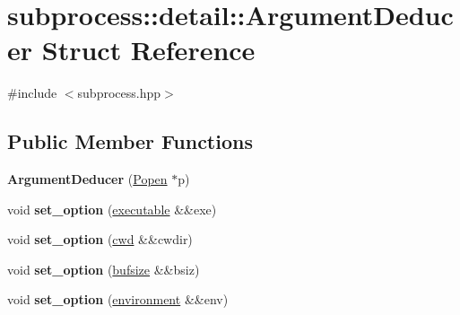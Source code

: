 \hypertarget{structsubprocess_1_1detail_1_1ArgumentDeducer}{}\section{subprocess\+:\+:detail\+:\+:Argument\+Deducer Struct Reference}
\label{structsubprocess_1_1detail_1_1ArgumentDeducer}


{\ttfamily \#include $<$subprocess.\+hpp$>$}

\subsection*{Public Member Functions}
\begin{DoxyCompactItemize}
\item 
\mbox{\label{structsubprocess_1_1detail_1_1ArgumentDeducer_abb82c9c0353424d16cc4559b6e1920f4}} 
{\bfseries Argument\+Deducer} (\hyperlink{classsubprocess_1_1Popen}{Popen} $\ast$p)
\item 
\mbox{\label{structsubprocess_1_1detail_1_1ArgumentDeducer_a91f839e8d405dfa79d1a4a78d2fa05ef}} 
void {\bfseries set\+\_\+option} (\hyperlink{structsubprocess_1_1executable}{executable} \&\&exe)
\item 
\mbox{\label{structsubprocess_1_1detail_1_1ArgumentDeducer_a09ee00861b40084d9430f9e3eb2ab66f}} 
void {\bfseries set\+\_\+option} (\hyperlink{structsubprocess_1_1cwd}{cwd} \&\&cwdir)
\item 
\mbox{\label{structsubprocess_1_1detail_1_1ArgumentDeducer_ac0bfccf003b6c760adfd0cce49b863ed}} 
void {\bfseries set\+\_\+option} (\hyperlink{structsubprocess_1_1bufsize}{bufsize} \&\&bsiz)
\item 
\mbox{\label{structsubprocess_1_1detail_1_1ArgumentDeducer_af7cd8a9ca886684a5a9440a639f6c13c}} 
void {\bfseries set\+\_\+option} (\hyperlink{structsubprocess_1_1environment}{environment} \&\&env)
\item 
\mbox{\label{structsubprocess_1_1detail_1_1ArgumentDeducer_a57986f237840cd7ac300640d4ae18290}} 

\end{DoxyCompactItemize}
